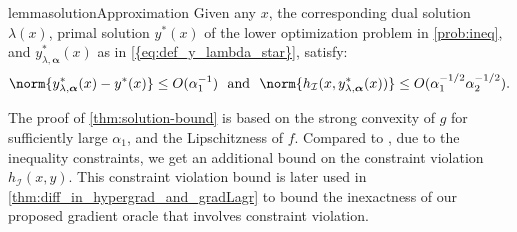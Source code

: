 \begin{restatable}[]{lemma}{solutionApproximation}\label{thm:solution-bound}
Given any $x$, the corresponding dual solution $\lambda(x)$,  primal solution $y^*(x)$ of the lower optimization problem in \cref{prob:ineq}, and $y_{\lambda, \boldsymbol{\alpha}}^*(x)$ as in \cref{{eq:def_y_lambda_star}}, satisfy:
\begin{align}\label{eqn:solution-bound}
    \norm{y_{\lambda, \boldsymbol{\alpha}}^*(x) - y^*(x)} \leq O(\alpha_1^{-1}) \text{~~and~~} \norm{h_\mathcal{I}(x,y_{\lambda, \boldsymbol{\alpha}}^*(x))} \leq O(\alpha_1^{-1/2} \alpha_2^{-1/2}).
\end{align}
\end{restatable}
The proof of \cref{thm:solution-bound} is based on the strong convexity of $g$ for sufficiently large $\alpha_1$, and the Lipschitzness of $f$. Compared to \cite{kwon2023fully}, due to the inequality constraints, we get an additional bound on the constraint violation $h_\mathcal{I}(x,y)$. This constraint violation bound is later used in \cref{thm:diff_in_hypergrad_and_gradLagr} to bound the inexactness of our proposed gradient oracle that involves constraint violation. 



